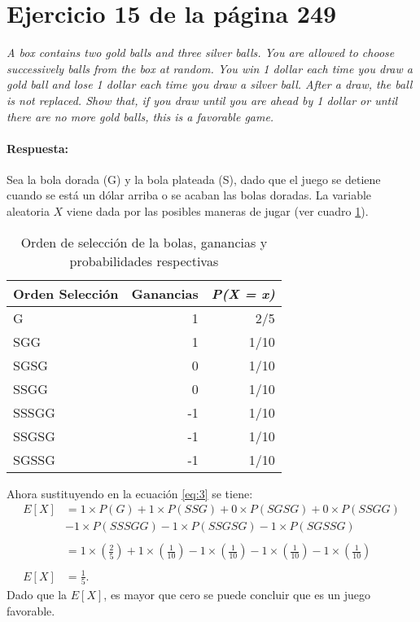 \documentclass{article}
\begin{document}
\section{Ejercicio 15 de la página 249}
\emph{A box contains two gold balls and three silver balls. You are allowed to choose successively balls from the box at random. You win 1 dollar each time you draw a gold ball and lose 1 dollar each time you draw a silver ball. After a draw, the ball is not replaced. Show that, if you draw until you are ahead by 1 dollar or until there are no more gold balls, this is a favorable game.}

\paragraph{Respuesta:} Sea la bola dorada (G) y la bola plateada (S), dado que el juego se detiene cuando se está un dólar arriba o se acaban las bolas doradas. La variable aleatoria $X$ viene dada por las posibles maneras de jugar (ver cuadro \ref{tab:4}).
\begin{table}[H]
  \centering
  \caption{Orden de selección de la bolas, ganancias y probabilidades respectivas }
    \begin{tabular}{lrr}
    \toprule
    \textbf{Orden  Selección} & \multicolumn{1}{l}{\textbf{Ganancias}} & \multicolumn{1}{l}{\textit{\textbf{P(X = x)}}} \\
    \midrule
    G     & 1     & 2/5 \\
    SGG   & 1     & 1/10 \\
    SGSG  & 0     & 1/10 \\
    SSGG  & 0     & 1/10 \\
    SSSGG & -1    & 1/10 \\
    SSGSG & -1    & 1/10 \\
    SGSSG & -1    & 1/10 \\
    \bottomrule
    \end{tabular}%
  \label{tab:4}%
\end{table}%
Ahora sustituyendo en la ecuación \ref{eq:3} se tiene:
\begin{equation}
\begin{array}{ll}
   E[X] &= 1\times P(G)+1\times P(SSG) + 0 \times P(SGSG) +0 \times P(SSGG) \\
   & -1\times P(SSSGG) -1 \times P(SSGSG) -1 \times P(SGSSG)\\
   &\\
    & = 1\times (\frac{2}{5})+ 1\times(\frac{1}{10})-1\times(\frac{1}{10})-1\times(\frac{1}{10}) -1\times(\frac{1}{10})\\ 
    &\\
   E[X] & = \frac{1}{5}.
 
  \end{array}
\end{equation}
  Dado que la $E[X]$, es mayor que cero se puede concluir que es un juego favorable.
\end{document}
